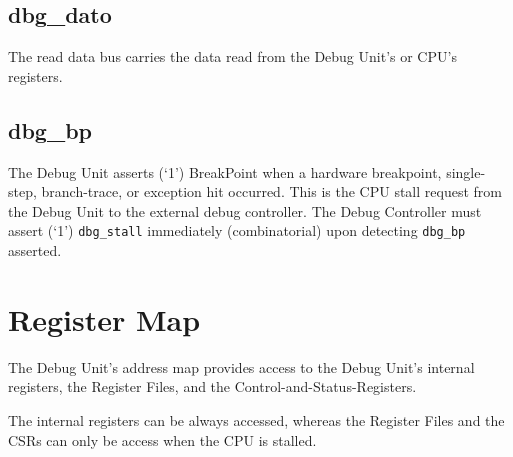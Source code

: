\subsection{dbg\_dato}\label{dbg_dato}

The read data bus carries the data read from the Debug Unit's or CPU's
registers.

\subsection{dbg\_bp}\label{dbg_bp}

The Debug Unit asserts (`1') BreakPoint when a hardware breakpoint,
single-step, branch-trace, or exception hit occurred. This is the CPU
stall request from the Debug Unit to the external debug controller. The
Debug Controller must assert (`1') \texttt{dbg\_stall} immediately
(combinatorial) upon detecting \texttt{dbg\_bp} asserted.

\pagebreak

\section{Register Map}\label{register-map}

The Debug Unit's address map provides access to the Debug Unit's
internal registers, the Register Files, and the
Control-and-Status-Registers.

The internal registers can be always accessed, whereas the Register
Files and the CSRs can only be access when the CPU is stalled.

